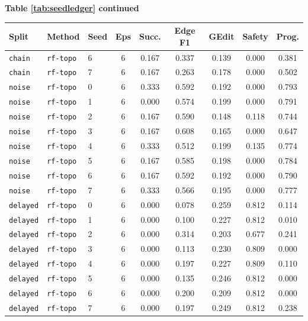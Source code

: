 \documentclass{article}
\begin{document}
\begin{center}
\textbf{Table \ref{tab:seedledger} continued}\\[0.4ex]
\begin{tabular}{lllcccccc}
\toprule
Split & Method & Seed & Eps & Succ. & Edge F1 & GEdit & Safety & Prog. \\
\midrule
\texttt{chain} & \texttt{rf-topo} & 6 & 6 & 0.167 & 0.337 & 0.139 & 0.000 & 0.381 \\
\texttt{chain} & \texttt{rf-topo} & 7 & 6 & 0.167 & 0.263 & 0.178 & 0.000 & 0.502 \\
\texttt{noise} & \texttt{rf-topo} & 0 & 6 & 0.333 & 0.592 & 0.192 & 0.000 & 0.793 \\
\texttt{noise} & \texttt{rf-topo} & 1 & 6 & 0.000 & 0.574 & 0.199 & 0.000 & 0.791 \\
\texttt{noise} & \texttt{rf-topo} & 2 & 6 & 0.167 & 0.590 & 0.148 & 0.118 & 0.744 \\
\texttt{noise} & \texttt{rf-topo} & 3 & 6 & 0.167 & 0.608 & 0.165 & 0.000 & 0.647 \\
\texttt{noise} & \texttt{rf-topo} & 4 & 6 & 0.333 & 0.512 & 0.199 & 0.135 & 0.774 \\
\texttt{noise} & \texttt{rf-topo} & 5 & 6 & 0.167 & 0.585 & 0.198 & 0.000 & 0.784 \\
\texttt{noise} & \texttt{rf-topo} & 6 & 6 & 0.167 & 0.592 & 0.192 & 0.000 & 0.790 \\
\texttt{noise} & \texttt{rf-topo} & 7 & 6 & 0.333 & 0.566 & 0.195 & 0.000 & 0.777 \\
\texttt{delayed} & \texttt{rf-topo} & 0 & 6 & 0.000 & 0.078 & 0.259 & 0.812 & 0.114 \\
\texttt{delayed} & \texttt{rf-topo} & 1 & 6 & 0.000 & 0.100 & 0.227 & 0.812 & 0.010 \\
\texttt{delayed} & \texttt{rf-topo} & 2 & 6 & 0.000 & 0.314 & 0.203 & 0.677 & 0.241 \\
\texttt{delayed} & \texttt{rf-topo} & 3 & 6 & 0.000 & 0.113 & 0.230 & 0.809 & 0.000 \\
\texttt{delayed} & \texttt{rf-topo} & 4 & 6 & 0.000 & 0.197 & 0.227 & 0.809 & 0.110 \\
\texttt{delayed} & \texttt{rf-topo} & 5 & 6 & 0.000 & 0.135 & 0.246 & 0.812 & 0.000 \\
\texttt{delayed} & \texttt{rf-topo} & 6 & 6 & 0.000 & 0.200 & 0.209 & 0.812 & 0.000 \\
\texttt{delayed} & \texttt{rf-topo} & 7 & 6 & 0.000 & 0.197 & 0.249 & 0.812 & 0.238 \\

\end{tabular}
\end{center}
\end{document}
